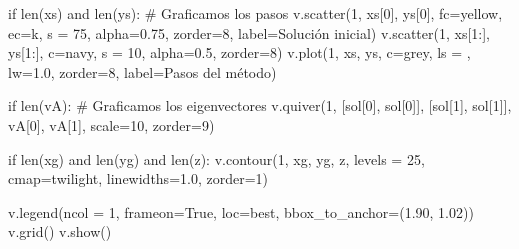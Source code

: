 \documentclass[
  letterpaper,
  DIV=11,
  numbers=noendperiod]{scrreprt}
\newenvironment{Shaded}{\begin{snugshade}}{\end{snugshade}}
\newcommand{\BuiltInTok}[1]{\textcolor[rgb]{0.00,0.23,0.31}{#1}}
\newcommand{\CommentTok}[1]{\textcolor[rgb]{0.37,0.37,0.37}{#1}}
\newcommand{\ControlFlowTok}[1]{\textcolor[rgb]{0.00,0.23,0.31}{#1}}
\newcommand{\DecValTok}[1]{\textcolor[rgb]{0.68,0.00,0.00}{#1}}
\newcommand{\FloatTok}[1]{\textcolor[rgb]{0.68,0.00,0.00}{#1}}
\newcommand{\KeywordTok}[1]{\textcolor[rgb]{0.00,0.23,0.31}{#1}}
\newcommand{\NormalTok}[1]{\textcolor[rgb]{0.00,0.23,0.31}{#1}}
\newcommand{\OperatorTok}[1]{\textcolor[rgb]{0.37,0.37,0.37}{#1}}
\newcommand{\StringTok}[1]{\textcolor[rgb]{0.13,0.47,0.30}{#1}}
\newcommand{\VariableTok}[1]{\textcolor[rgb]{0.07,0.07,0.07}{#1}}
\begin{document}
\begin{Shaded}
\begin{Highlighting}[]
    \ControlFlowTok{if} \BuiltInTok{len}\NormalTok{(xs) }\KeywordTok{and} \BuiltInTok{len}\NormalTok{(ys):}
        \CommentTok{\# Graficamos los pasos}
\NormalTok{        v.scatter(}\DecValTok{1}\NormalTok{, xs[}\DecValTok{0}\NormalTok{], ys[}\DecValTok{0}\NormalTok{], fc}\OperatorTok{=}\StringTok{\textquotesingle{}yellow\textquotesingle{}}\NormalTok{, ec}\OperatorTok{=}\StringTok{\textquotesingle{}k\textquotesingle{}}\NormalTok{, s }\OperatorTok{=} \DecValTok{75}\NormalTok{, alpha}\OperatorTok{=}\FloatTok{0.75}\NormalTok{, zorder}\OperatorTok{=}\DecValTok{8}\NormalTok{, label}\OperatorTok{=}\StringTok{\textquotesingle{}Solución inicial\textquotesingle{}}\NormalTok{)}
\NormalTok{        v.scatter(}\DecValTok{1}\NormalTok{, xs[}\DecValTok{1}\NormalTok{:], ys[}\DecValTok{1}\NormalTok{:], c}\OperatorTok{=}\StringTok{\textquotesingle{}navy\textquotesingle{}}\NormalTok{, s }\OperatorTok{=} \DecValTok{10}\NormalTok{, alpha}\OperatorTok{=}\FloatTok{0.5}\NormalTok{, zorder}\OperatorTok{=}\DecValTok{8}\NormalTok{)}
\NormalTok{        v.plot(}\DecValTok{1}\NormalTok{, xs, ys, c}\OperatorTok{=}\StringTok{\textquotesingle{}grey\textquotesingle{}}\NormalTok{, ls }\OperatorTok{=} \StringTok{\textquotesingle{}{-}{-}\textquotesingle{}}\NormalTok{, lw}\OperatorTok{=}\FloatTok{1.0}\NormalTok{, zorder}\OperatorTok{=}\DecValTok{8}\NormalTok{, label}\OperatorTok{=}\StringTok{\textquotesingle{}Pasos del método\textquotesingle{}}\NormalTok{)}

    \ControlFlowTok{if} \BuiltInTok{len}\NormalTok{(vA):}
        \CommentTok{\# Graficamos los eigenvectores}
\NormalTok{        v.quiver(}\DecValTok{1}\NormalTok{, [sol[}\DecValTok{0}\NormalTok{], sol[}\DecValTok{0}\NormalTok{]], [sol[}\DecValTok{1}\NormalTok{], sol[}\DecValTok{1}\NormalTok{]], vA[}\DecValTok{0}\NormalTok{], vA[}\DecValTok{1}\NormalTok{], scale}\OperatorTok{=}\DecValTok{10}\NormalTok{, zorder}\OperatorTok{=}\DecValTok{9}\NormalTok{)}

    \ControlFlowTok{if} \BuiltInTok{len}\NormalTok{(xg) }\KeywordTok{and} \BuiltInTok{len}\NormalTok{(yg) }\KeywordTok{and} \BuiltInTok{len}\NormalTok{(z):}
\NormalTok{        v.contour(}\DecValTok{1}\NormalTok{, xg, yg, z, levels }\OperatorTok{=} \DecValTok{25}\NormalTok{, cmap}\OperatorTok{=}\StringTok{\textquotesingle{}twilight\textquotesingle{}}\NormalTok{, linewidths}\OperatorTok{=}\FloatTok{1.0}\NormalTok{, zorder}\OperatorTok{=}\DecValTok{1}\NormalTok{)        }
        
\NormalTok{    v.legend(ncol }\OperatorTok{=} \DecValTok{1}\NormalTok{, frameon}\OperatorTok{=}\VariableTok{True}\NormalTok{, loc}\OperatorTok{=}\StringTok{\textquotesingle{}best\textquotesingle{}}\NormalTok{, bbox\_to\_anchor}\OperatorTok{=}\NormalTok{(}\FloatTok{1.90}\NormalTok{, }\FloatTok{1.02}\NormalTok{))}
\NormalTok{    v.grid()}
\NormalTok{    v.show()}
\end{Highlighting}
\end{Shaded}
\end{document}
